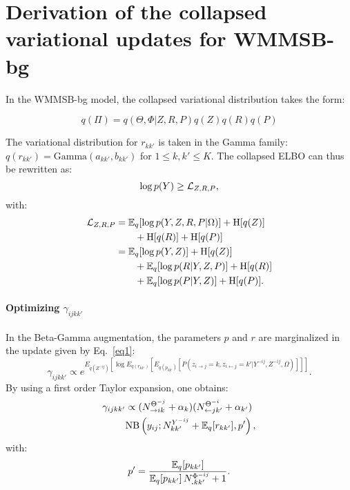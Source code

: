 
\section{Derivation of the collapsed variational updates for WMMSB-bg}
\label{app:collap}


In the WMMSB-bg model, the collapsed variational distribution takes the form:

\begin{equation*}
q(\Pi) = q(\Theta, \Phi|Z, R, P) q(Z)q(R)q(P)
\end{equation*}

The variational distribution for $r_{kk'}$ is taken in the Gamma family:  $q(r_{kk'}) = \textrm{Gamma}(a_{kk'},b_{kk'})$ for $1\leq k,k' \leq K$. The collapsed ELBO can thus be rewritten as:
%
\[
\log p(Y) \geq \mathcal{L}_{Z,R,P},
\]
%
with:
\begin{align*}
\mathcal{L}_{Z,R,P} &= \mathbb{E}_{q}[\log p(Y, Z, R, P|\Omega)] + \textrm{H}[q(Z)] \\
& \qquad + \textrm{H}[q(R)] + \textrm{H}[q(P)] \\
& = \mathbb{E}_{q}[\log p(Y, Z)] + \textrm{H}[q(Z)] \\
& \qquad + \mathbb{E}_{q}[\log p(R|Y,Z,P)] + \textrm{H}[q(R)] \\
& \qquad +\mathbb{E}_{q}[\log p(P|Y,Z)] + \textrm{H}[q(P)].
\end{align*}

\paragraph{Optimizing $\gamma_{ijkk'}$}

In the Beta-Gamma augmentation, the parameters $p$ and $r$ are marginalized in the update given by Eq.~\eqref{eq1}:
%
\begin{equation}
\gamma_{ijkk'} \propto e^{E_{q(Z^{-ij})} [\log E_{q(r_{kk'})}[E_{q(p_{kk'})}[ P(z_{i\rightarrow j}=k, z_{i\leftarrow j}=k' | Y^{-ij}, Z^{-ij}, \Omega) ] ] ]}. \nonumber
\end{equation}
%
By using a first order Taylor expansion, one obtains:
%
\begin{align*}
\gamma_{ijkk'} & \propto (N_{\rightarrow ik}^{\Theta^{-j}} + \alpha_k) (N_{\leftarrow jk'}^{\Theta^{-i}} + \alpha_{k'}) \\
& \mathrm{NB}\left(y_{ij}; N^{Y^{-ij}}_{kk'} + \mathbb{E}_{q}[r_{kk'}], p' \right),
\end{align*}
%
with:
%
\[
p' = \frac{\mathbb{E}_{q}[p_{kk'}]}{\mathbb{E}_{q}[p_{kk'}]\,N^{\Phi^{-ij}}_{\bm{.}kk'} + 1}.
\]

